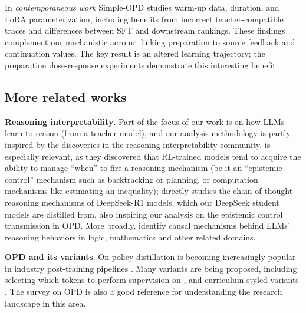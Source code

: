 In \emph{contemporaneous work} Simple-OPD \citep{liu2026simpleopd} studies warm-up data, duration, and LoRA parameterization, including benefits from incorrect teacher-compatible traces and differences between SFT and downstream rankings. These findings complement our mechanistic account linking preparation to source feedback and continuation values. The key result is an altered learning trajectory; the preparation dose-response experiments demonstrate this interesting benefit.

\subsection{More related works}
\noindent\textbf{Reasoning interpretability}. Part of the focus of our work is on how LLMs learn to reason (from a teacher model), and our analysis methodology is partly inspired by the discoveries in the reasoning interpretability community. \citet{venhoff2025base} is especially relevant, as they discovered that RL-trained models tend to acquire the ability to manage ``when'' to fire a reasoning mechanism (be it an ``epistemic control'' mechanism such as backtracking or planning, or computation mechanisms like estimating an inequality); \cite{marjanovic2026deepseekr} directly studies the chain-of-thought reasoning mechanisms of DeepSeek-R1 models, which our DeepSeek student models are distilled from, also inspiring our analysis on the epistemic control transmission in OPD. More broadly, \cite{bogdan2025thoughtanchorsllmreasoning, baek2025understandingdistilledreasoningmodels, venhoff2025understandingreasoningthinkinglanguage, troitskii-etal-2025-internal, NEURIPS2025_2c447757, ward2025reasoningfinetuningrepurposeslatentrepresentations} identify causal mechanisms behind LLMs' reasoning behaviors in logic, mathematics and other related domains.

\textbf{OPD and its variants}. On-policy distillation is becoming increasingly popular in industry post-training pipelines \citep{deepseekai2026deepseekv4highlyefficientmilliontoken, kimiteam2026kimik3openfrontier}. Many variants are being proposed, including selecting which tokens to perform supervision on \citep{jin2026entropyaware,yu2026mismatchmattersonpolicydistillation}, and curriculum-styled variants \citep{ziheng2026moreearlystoppingrollout,zhang2026rolloutsnecessaryonpolicydistillation,li2026onpolicydistillationcurriculumturnlevel}. The survey on OPD \citet{song2026surveyonpolicydistillationlarge} is also a good reference for understanding the research landscape in this area.

